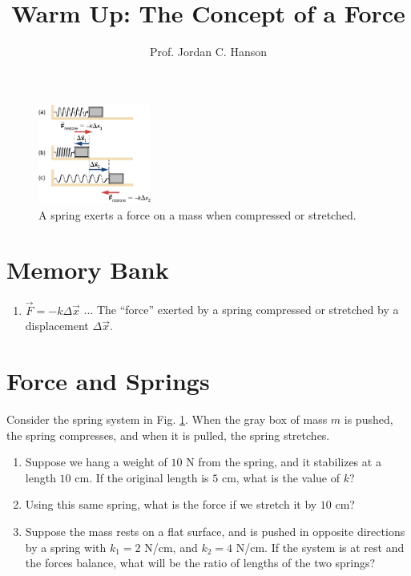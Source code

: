 \documentclass{article}
\begin{document}
\title{Warm Up: The Concept of a Force}
\author{Prof. Jordan C. Hanson}

\maketitle

\begin{figure}
\centering
\includegraphics[width=0.33\textwidth]{figures/spring.jpeg}
\caption{\label{fig:1} A spring exerts a force on a mass when compressed or stretched.}
\end{figure}

\section{Memory Bank}

\begin{enumerate}
\item $\vec{F} = - k \Delta \vec{x}$ ... The ``force'' exerted by a spring compressed or stretched by a displacement $\Delta \vec{x}$.
\end{enumerate}

\section{Force and Springs}

Consider the spring system in Fig. \ref{fig:1}.  When the gray box of mass $m$ is pushed, the spring compresses, and when it is pulled, the spring stretches.
\begin{enumerate}
\item Suppose we hang a weight of $10$ N from the spring, and it stabilizes at a length $10$ cm.  If the original length is $5$ cm, what is the value of $k$? \\ \vspace{1cm}
\item Using this same spring, what is the force if we stretch it by $10$ cm? \\ \vspace{1cm}
\item Suppose the mass rests on a flat surface, and is pushed in opposite directions by a spring with $k_1 = 2$ N/cm, and $k_2 = 4$ N/cm.  If the system is at rest and the forces balance, what will be the ratio of lengths of the two springs?
\end{enumerate}
\end{document}

